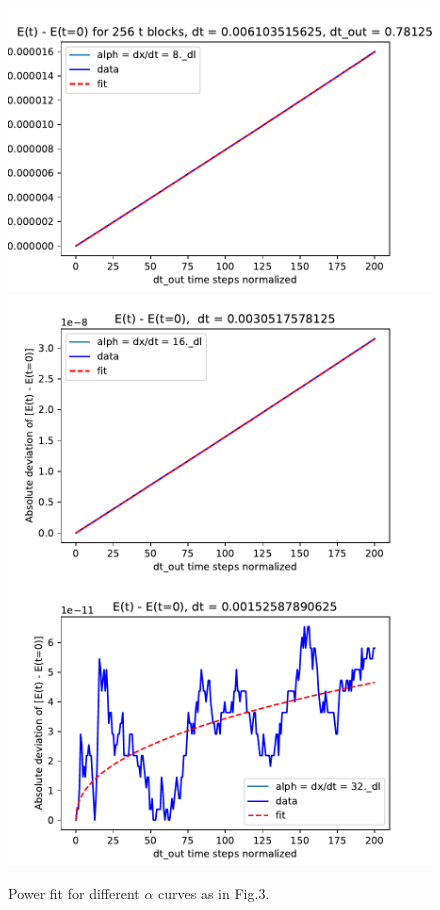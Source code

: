 \documentclass{article}
\begin{document}
\begin{figure}[H]
    \includegraphics[scale=0.35]{E_dev_alph=8}
    \includegraphics[scale=0.35]{E_dev_alph=16}
    \includegraphics[scale=0.35]{E_dev_alph=32}
    \caption{Power fit for different $\alpha$ curves as in Fig.3.}
    \label{fig:Q1}
\end{figure}
\end{document}
